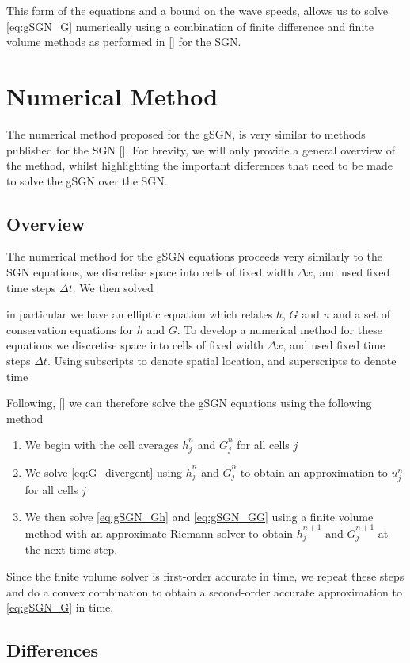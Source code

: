 \documentclass[10pt]{elsarticle}
\begin{document}
This form of the equations and a bound on the wave speeds, allows us to solve \eqref{eq:gSGN_G} numerically using a combination of finite difference and finite volume methods as performed in [] for the SGN.


\section{Numerical Method}
The numerical method proposed for the gSGN, is very similar to methods published for the SGN []. For brevity, we will only provide a general overview of the method, whilst highlighting the important differences that need to be made to solve the gSGN over the SGN.

\subsection{Overview}
The numerical method for the gSGN equations proceeds very similarly to the SGN equations, we discretise space into cells of fixed width $\Delta x$, and used fixed time steps $\Delta t$. We then solved 


in particular we have an elliptic equation which relates $h$, $G$ and $u$ and a set of conservation equations for $h$ and $G$. To develop a numerical method for these equations we discretise space into cells of fixed width $\Delta x$, and used fixed time steps $\Delta t$. Using subscripts to denote spatial location, and superscripts to denote time



Following, [] we can therefore solve the gSGN equations using the following method
\begin{enumerate}
	\item We begin with the cell averages $\bar{h}^n_j$ and $\bar{G}^n_j$ for all cells $j$
	\item We solve \eqref{eq:G_divergent} using $\bar{h}^n_j$ and $\bar{G}^n_j$ to obtain an approximation to $u^n_j$ for all cells $j$
	\item We then solve \eqref{eq:gSGN_Gh} and \eqref{eq:gSGN_GG} using a finite volume method with an approximate Riemann solver to obtain $\bar{h}^{n+1}_j$ and $\bar{G}^{n+1}_j$ at the next time step.
\end{enumerate}
Since the finite volume solver is first-order accurate in time, we repeat these steps and do a convex combination to obtain a second-order accurate approximation to \eqref{eq:gSGN_G} in time. 

\subsection{Differences}
\end{document}
